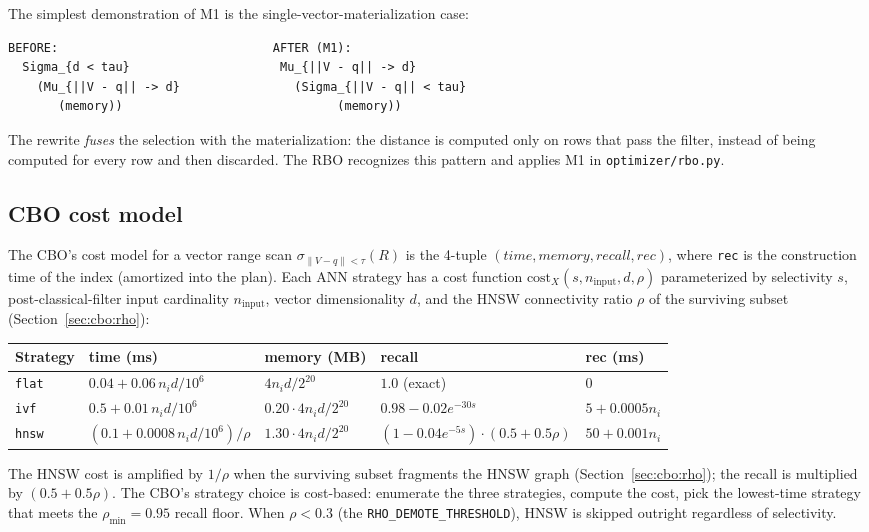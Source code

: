 \documentclass[sigconf,nonacm,review]{acmart}
\theoremstyle{plain}
\theoremstyle{definition}
\theoremstyle{remark}
\begin{document}
The simplest demonstration of M1 is the
single-vector-materialization case:

\begin{verbatim}
BEFORE:                              AFTER (M1):
  Sigma_{d < tau}                     Mu_{||V - q|| -> d}
    (Mu_{||V - q|| -> d}                (Sigma_{||V - q|| < tau}
       (memory))                              (memory))
\end{verbatim}

The rewrite \emph{fuses} the selection with the materialization:
the distance is computed only on rows that pass the filter,
instead of being computed for every row and then discarded. The
RBO recognizes this pattern and applies M1 in
\texttt{optimizer/rbo.py}.

\subsection{CBO cost model}\label{app:proto:cbo}

The CBO's cost model for a vector range scan
$\sigma_{\|V - q\| < \tau}(R)$ is the 4-tuple
$(\mathit{time}, \mathit{memory}, \mathit{recall},
\mathit{rec})$, where \texttt{rec} is the construction time
of the index (amortized into the plan). Each ANN strategy
has a cost function
$\text{cost}_X(s, n_{\text{input}}, d, \rho)$
parameterized by selectivity $s$, post-classical-filter
input cardinality $n_{\text{input}}$, vector dimensionality
$d$, and the HNSW connectivity ratio $\rho$ of the surviving
subset (Section~\ref{sec:cbo:rho}):

\begin{center}
\begin{tabular}{lllll}
\toprule
Strategy & time (ms)                              & memory (MB) & recall & rec (ms) \\
\midrule
\texttt{flat}  & $0.04 + 0.06\, n_i d / 10^6$        & $4 n_i d / 2^{20}$          & $1.0$ (exact)        & $0$            \\
\texttt{ivf}   & $0.5 + 0.01\, n_i d / 10^6$         & $0.20 \cdot 4 n_i d / 2^{20}$ & $0.98 - 0.02 e^{-30 s}$ & $5 + 0.0005 n_i$  \\
\texttt{hnsw}  & $(0.1 + 0.0008\, n_i d / 10^6) / \rho$ & $1.30 \cdot 4 n_i d / 2^{20}$ & $(1 - 0.04 e^{-5 s}) \cdot (0.5 + 0.5 \rho)$  & $50 + 0.001 n_i$  \\
\bottomrule
\end{tabular}
\end{center}

The HNSW cost is amplified by $1/\rho$ when the surviving subset
fragments the HNSW graph (Section~\ref{sec:cbo:rho}); the
recall is multiplied by $(0.5 + 0.5\rho)$. The CBO's
strategy choice is cost-based: enumerate the three strategies,
compute the cost, pick the lowest-time strategy that meets the
$\rho_{\min} = 0.95$ recall floor. When $\rho < 0.3$ (the
\texttt{RHO\_DEMOTE\_THRESHOLD}), HNSW is skipped outright
regardless of selectivity.
\end{document}
